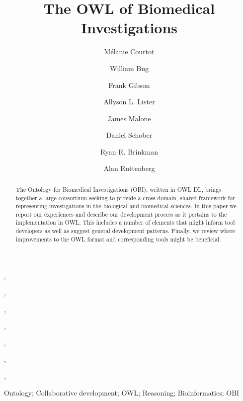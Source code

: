 \documentclass{elsart}       %
\begin{document}
\begin{frontmatter}

\title{The OWL of Biomedical Investigations}


\author[tfl]{M\'elanie Courtot},
\author[ucsd]{William Bug},
\author[new]{Frank Gibson},
\author[cisban]{Allyson L. Lister},
\author[ebi]{James Malone},
\author[ebi,IMBI]{Daniel Schober},
\author[tfl]{Ryan R. Brinkman},
\author[sc]{Alan Ruttenberg}



\medskip


\address[tfl]{Terry Fox Laboratory, British Columbia Cancer Agency, Vancouver, BC, Canada}
\address[ucsd]{National Center for Microscopy Imaging Research, UCSD, CA, USA}
\address[new]{School of Computing Science, Newcastle University, Newcastle upon Tyne, UK}
\address[cisban]{CISBAN and School of Computing Science, Newcastle University, Newcastle upon Tyne, UK}
\address[ebi]{The European Bioinformatics Institute, Cambridge, CB101SD, UK}
\address[IMBI]{Institute of Medical Biometry and Medical Informatics (IMBI), University Medical Center, 70104 Freiburg, Germany}
\address[sc]{Science Commons, Cambridge, MA, USA}

\begin{abstract} 

The Ontology for Biomedical Investigations (OBI), written in OWL DL, brings together a large consortium seeking to provide a cross-domain, shared framework for representing investigations in the biological and biomedical sciences. In this paper we report our experiences and describe our development process as it pertains to the implementation in OWL.
This includes a number of elements that might inform tool developers as well as suggest general development patterns.
Finally, we review where improvements to the OWL format and corresponding tools might be beneficial.

\end{abstract}


\begin{keyword}
Ontology; Collaborative development; OWL; Reasoning; Bioinformatics; OBI
\end{keyword}
\end{frontmatter}
\end{document}
